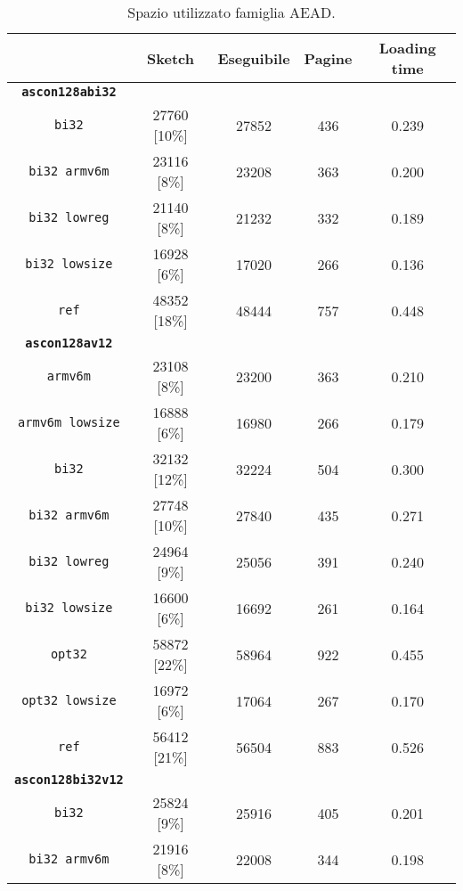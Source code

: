 \begin{table}[h]
    \caption{Spazio utilizzato famiglia AEAD.}
    \centering
	\begin{tabular}{|c|c|c|c|c|}
		\hline
         & \textbf{Sketch} & \textbf{Eseguibile} & \textbf{Pagine} & \textbf{Loading time} \\
        \hline
        \texttt{\textbf{ascon128abi32}} & & & & \\
        \hline  
        \texttt{bi32} & 27760 [10\%] & 27852 & 436 & 0.239 \\
        \hline
        \texttt{bi32 armv6m} & 23116 [8\%] & 23208 & 363 & 0.200 \\
        \hline
        \texttt{bi32 lowreg} & 21140 [8\%] & 21232 & 332 & 0.189 \\
        \hline
        \texttt{bi32 lowsize} & 16928 [6\%] & 17020 & 266 & 0.136 \\
        \hline
        \texttt{ref} & 48352 [18\%] & 48444 & 757 & 0.448 \\
        \hline
        \texttt{\textbf{ascon128av12}} & & & & \\
        \hline
        \texttt{armv6m} & 23108 [8\%] & 23200 & 363 & 0.210 \\
        \hline
        \texttt{armv6m lowsize} & 16888 [6\%] & 16980 & 266 & 0.179 \\
        \hline
        \texttt{bi32} & 32132 [12\%] & 32224 & 504 & 0.300 \\
        \hline
        \texttt{bi32 armv6m} & 27748 [10\%] & 27840 & 435 & 0.271 \\
        \hline
        \texttt{bi32 lowreg} & 24964 [9\%] & 25056 & 391 & 0.240 \\
        \hline
        \texttt{bi32 lowsize} & 16600 [6\%] & 16692 & 261 & 0.164 \\
        \hline
        \texttt{opt32} & 58872 [22\%] & 58964 & 922 & 0.455 \\
        \hline
        \texttt{opt32 lowsize} & 16972 [6\%] & 17064 & 267 & 0.170 \\
        \hline
        \texttt{ref} & 56412 [21\%] & 56504 & 883 & 0.526 \\
        \hline
        \texttt{\textbf{ascon128bi32v12}} & & & & \\
        \hline
        \texttt{bi32} & 25824 [9\%] & 25916 & 405 & 0.201 \\
        \hline
        \texttt{bi32 armv6m} & 21916 [8\%] & 22008 & 344 & 0.198 \\
        \hline

\end{tabular}
\end{table}
